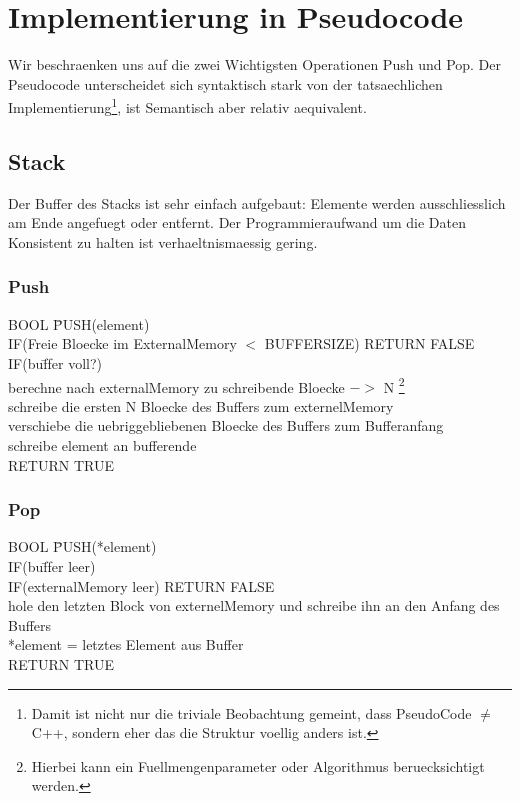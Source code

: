 \documentclass[10pt,a4paper]{article}
\begin{document}
\section{Implementierung in Pseudocode}
Wir beschraenken uns auf die zwei Wichtigsten Operationen Push und Pop. Der Pseudocode unterscheidet sich syntaktisch stark von der tatsaechlichen Implementierung\footnote{Damit ist nicht nur die triviale Beobachtung gemeint, dass PseudoCode $\neq$ C++, sondern eher das die Struktur voellig anders ist.}, ist Semantisch aber relativ aequivalent.
\subsection{Stack}
Der Buffer des Stacks ist sehr einfach aufgebaut: Elemente werden ausschliesslich am Ende angefuegt oder entfernt. Der Programmieraufwand um die Daten Konsistent zu halten ist verhaeltnismaessig gering.
\subsubsection{Push}
\begin{tabbing}
BOOL \= PUSH(element)\\
	\> IF(Freie Bloecke im ExternalMemory $<$ BUFFERSIZE) RETURN FALSE \\
	\> IF(bu\= ffer voll?)\\
		\>\> berechne nach externalMemory zu schreibende Bloecke $->$ N \footnote{Hierbei kann ein Fuellmengenparameter oder Algorithmus beruecksichtigt werden.} \\
		\>\> schreibe die ersten N Bloecke des Buffers zum externelMemory\\
		\>\> verschiebe die uebriggebliebenen Bloecke des Buffers zum Bufferanfang\\
	\> schreibe element an bufferende\\
	\> RETURN TRUE\\
\end{tabbing}
\subsubsection{Pop}
\begin{tabbing}
BOOL \= PUSH(*element)\\
	\> IF(bu\= ffer leer)\\
		\>\> IF(externalMemory leer) RETURN FALSE\\
		\>\> hole den letzten Block von externelMemory und schreibe ihn an den Anfang des Buffers\\
	\> *element = letztes Element aus Buffer\\
	\> RETURN TRUE\\
\end{tabbing}
\end{document}
